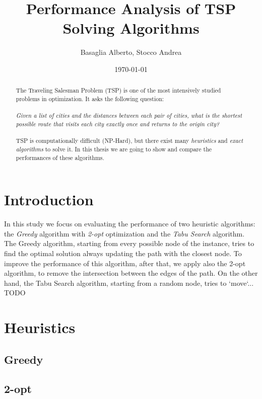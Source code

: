 \documentclass{article}
\title{Performance Analysis of TSP Solving Algorithms}
\author{Basaglia Alberto, Stocco Andrea}
\date{\today}
\begin{document}
\maketitle

\begin{abstract}
	The Traveling Salesman Problem (TSP) is one of the most intensively studied problems in optimization.
	It asks the following question:\\\\
	\textit{Given a list of cities and the distances between each pair of cities, what is the shortest possible route 
	that visits each city exactly once and returns to the origin city?}\\\\
	TSP is computationally difficult (NP-Hard), but there exist many \textit{heuristics} and \textit{exact algorithms} to solve it.
	In this thesis we are going to show and compare the performances of these algorithms. 
\end{abstract}

\section{Introduction}
In this study we focus on evaluating the performance of two heuristic algorithms: the \textit{Greedy} algorithm with \textit{2-opt} 
optimization and the \textit{Tabu Search} algorithm.
The Greedy algorithm, starting from every possible node of the instance, tries to find the optimal solution always updating the path
with the closest node. To improve the performance of this algorithm, after that, we apply also the 2-opt algorithm, to remove 
the intersection between the edges of the path.
On the other hand, the Tabu Search algorithm, starting from a random node, tries to `move`... TODO

\section{Heuristics}
\subsection{Greedy}
\subsection{2-opt}
\end{document}
